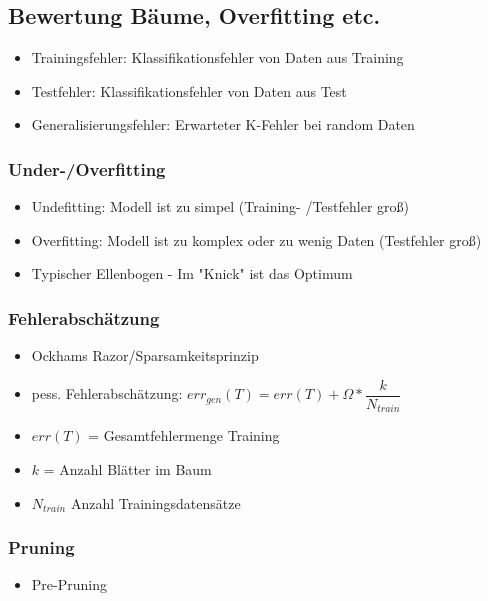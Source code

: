 \documentclass[a4paper]{article}
\begin{document}
\begin{landscape}
\begin{multicols}{3}
        \subsection{Bewertung Bäume, Overfitting etc.}
        \begin{itemize}[noitemsep,nolistsep]
            \item Trainingsfehler: Klassifikationsfehler von Daten aus Training
            \item Testfehler:  Klassifikationsfehler von Daten aus Test
            \item Generalisierungsfehler: Erwarteter K-Fehler bei random Daten
        \end{itemize}
        \subsubsection{Under-/Overfitting}
        \begin{itemize}[noitemsep,nolistsep]
            \item Undefitting: Modell ist zu simpel (Training- /Testfehler groß)
            \item Overfitting: Modell ist zu komplex oder zu wenig Daten (Testfehler groß)
            \item Typischer Ellenbogen - Im "Knick" ist das Optimum
        \end{itemize}

        \subsubsection{Fehlerabschätzung}
        \begin{itemize}[noitemsep,nolistsep]
            \item Ockhams Razor/Sparsamkeitsprinzip
            \item pess. Fehlerabschätzung: $err_{gen}(T) = err(T) + \Omega * \dfrac{k}{N_{train}}$
            \item $err(T)$ = Gesamtfehlermenge Training
            \item $k$ = Anzahl Blätter im Baum
            \item $N_{train}$ Anzahl Trainingsdatensätze
        \end{itemize}
        \subsubsection{Pruning}
        \begin{itemize}[noitemsep,nolistsep]
            \item Pre-Pruning
        \end{itemize}


\end{multicols}
\end{landscape}
\end{document}
